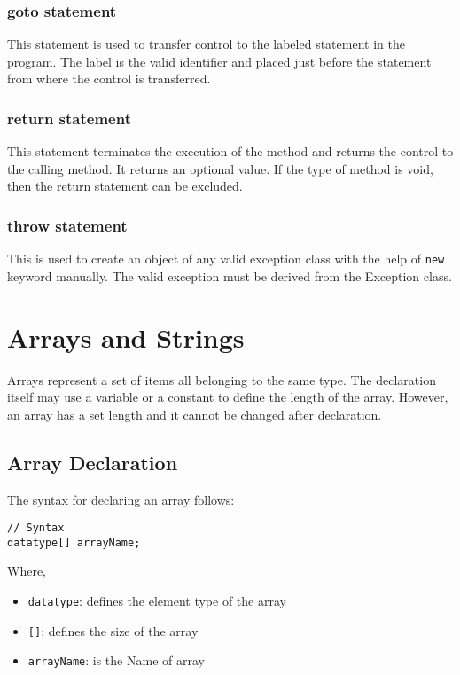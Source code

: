 \subsubsection*{goto statement}
This statement is used to transfer control to the labeled statement in the program. The label is the valid identifier and placed just before the statement from where the control is transferred.

\subsubsection*{return statement}
This statement terminates the execution of the method and returns the control to the calling method. It returns an optional value. If the type of method is void, then the return statement can be excluded.

\subsubsection*{throw statement}
This is used to create an object of any valid exception class with the help of \verb|new| keyword manually. The valid exception must be derived from the Exception class.


\section{Arrays and Strings}

Arrays represent a set of items all belonging to the same type. The declaration itself may use a variable or a constant to define the length of the array. However, an array has a set length and it cannot be changed after declaration.

\subsection{Array Declaration}
The syntax for declaring an array follows:

\begin{lstlisting}[numbers=none]
// Syntax
datatype[] arrayName;
\end{lstlisting}
Where,
\begin{itemize}
	\item \texttt{datatype}: defines the element type of the array
	\item \texttt{[]}: defines the size of the array
	\item \texttt{arrayName}: is the Name of array
\end{itemize}

